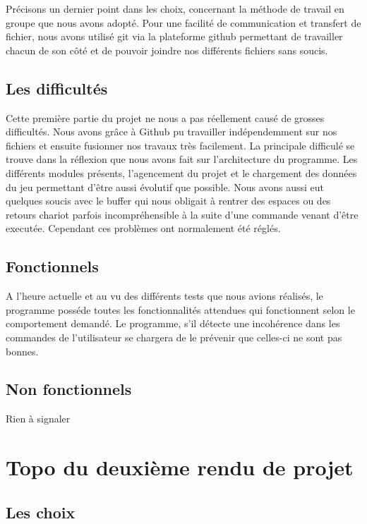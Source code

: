 \documentclass[10pt,a4paper,twocolumn]{report}
\begin{document}
Précisons un dernier point dans les choix, concernant la méthode de travail en groupe que nous avons adopté. Pour une facilité de communication et transfert de fichier, nous avons utilisé git via la plateforme github permettant de travailler chacun de son côté et de pouvoir joindre nos différents fichiers sans soucis.

\section{Les difficultés}

Cette première partie du projet ne nous a pas réellement causé de grosses difficultés. Nous avons grâce à Github pu travailler indépendemment sur nos fichiers et ensuite fusionner nos travaux très facilement.
La principale difficulé se trouve dans la réflexion que nous avons fait sur l'architecture du programme. Les différents modules présents, l'agencement du projet et le chargement des données du jeu permettant d'être aussi évolutif que possible.
Nous avons aussi eut quelques soucis avec le buffer qui nous obligait à rentrer des espaces ou des retours chariot parfois incompréhensible à la suite d'une commande venant d'être executée. Cependant ces problèmes ont normalement été réglés.

\section{Fonctionnels}

A l'heure actuelle et au vu des différents tests que nous avions réalisés, le programme posséde toutes les fonctionnalités attendues qui fonctionnent selon le comportement demandé.
Le programme, s'il détecte une incohérence dans les commandes de l'utilisateur se chargera de le prévenir que celles-ci ne sont pas bonnes.

\section{Non fonctionnels}
Rien à signaler

\chapter{Topo du deuxième rendu de projet}

\section{Les choix}
\end{document}
